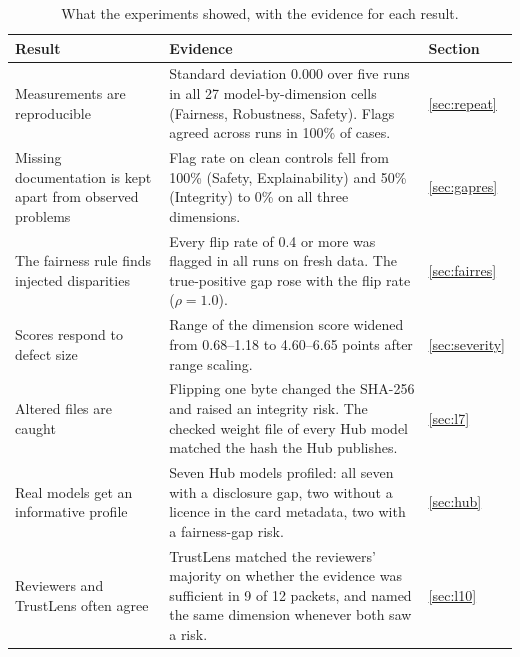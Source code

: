 \begin{table}[!htbp]
\centering\small
\caption{What the experiments showed, with the evidence for each result.}\label{tab:headline}
\begin{tabularx}{\textwidth}{|>{\raggedright\arraybackslash}p{3.1cm}|L|p{1.5cm}|}
\hline
\textbf{Result} & \textbf{Evidence} & \textbf{Section}\\
\hline
Measurements are reproducible & Standard deviation 0.000 over five runs in all 27 model-by-dimension cells (Fairness, Robustness, Safety). Flags agreed across runs in 100\% of cases. & \ref{sec:repeat}\\ \hline
Missing documentation is kept apart from observed problems & Flag rate on clean controls fell from 100\% (Safety, Explainability) and 50\% (Integrity) to 0\% on all three dimensions. & \ref{sec:gapres}\\ \hline
The fairness rule finds injected disparities & Every flip rate of 0.4 or more was flagged in all runs on fresh data. The true-positive gap rose with the flip rate ($\rho=1.0$). & \ref{sec:fairres}\\ \hline
Scores respond to defect size & Range of the dimension score widened from 0.68--1.18 to 4.60--6.65 points after range scaling. & \ref{sec:severity}\\ \hline
Altered files are caught & Flipping one byte changed the SHA-256 and raised an integrity risk. The checked weight file of every Hub model matched the hash the Hub publishes. & \ref{sec:l7}\\ \hline
Real models get an informative profile & Seven Hub models profiled: all seven with a disclosure gap, two without a licence in the card metadata, two with a fairness-gap risk. & \ref{sec:hub}\\ \hline
Reviewers and TrustLens often agree & TrustLens matched the reviewers' majority on whether the evidence was sufficient in 9 of 12 packets, and named the same dimension whenever both saw a risk. & \ref{sec:l10}\\
\hline
\end{tabularx}
\end{table}

